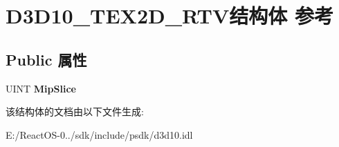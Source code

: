 \hypertarget{struct_d3_d10___t_e_x2_d___r_t_v}{}\section{D3\+D10\+\_\+\+T\+E\+X2\+D\+\_\+\+R\+T\+V结构体 参考}
\label{struct_d3_d10___t_e_x2_d___r_t_v}
\subsection*{Public 属性}
\begin{DoxyCompactItemize}
\item 
\mbox{\label{struct_d3_d10___t_e_x2_d___r_t_v_a12e433fa269a41ceb6e8fd105a25670b}} 
U\+I\+NT {\bfseries Mip\+Slice}
\end{DoxyCompactItemize}


该结构体的文档由以下文件生成\+:\begin{DoxyCompactItemize}
\item 
E\+:/\+React\+O\+S-\/0../sdk/include/psdk/d3d10.\+idl\end{DoxyCompactItemize}
